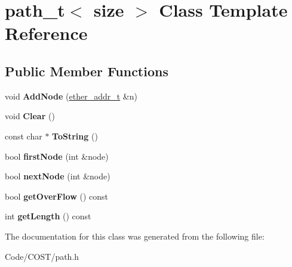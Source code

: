 \hypertarget{classpath__t}{}\section{path\+\_\+t$<$ size $>$ Class Template Reference}
\label{classpath__t}
\subsection*{Public Member Functions}
\begin{DoxyCompactItemize}
\item 
\mbox{\label{classpath__t_a84c637f04e776d963398f85d83aa17d2}} 
void {\bfseries Add\+Node} (\hyperlink{classether__addr__t}{ether\+\_\+addr\+\_\+t} \&n)
\item 
\mbox{\label{classpath__t_a4719635d75048870259720d6b93f5e0e}} 
void {\bfseries Clear} ()
\item 
\mbox{\label{classpath__t_a296d5c458919b4b3b6c89c7aebf43cca}} 
const char $\ast$ {\bfseries To\+String} ()
\item 
\mbox{\label{classpath__t_a811df642bc33548b8e574e0b1d375280}} 
bool {\bfseries first\+Node} (int \&node)
\item 
\mbox{\label{classpath__t_a3a9ea47641a8c35cd70587fea2650766}} 
bool {\bfseries next\+Node} (int \&node)
\item 
\mbox{\label{classpath__t_aca2e1878b27a6fe13669355d6f47b246}} 
bool {\bfseries get\+Over\+Flow} () const
\item 
\mbox{\label{classpath__t_ae5a3e6d1f0387fa0d5350bfd31656673}} 
int {\bfseries get\+Length} () const
\end{DoxyCompactItemize}


The documentation for this class was generated from the following file\+:\begin{DoxyCompactItemize}
\item 
Code/\+C\+O\+S\+T/path.\+h\end{DoxyCompactItemize}
